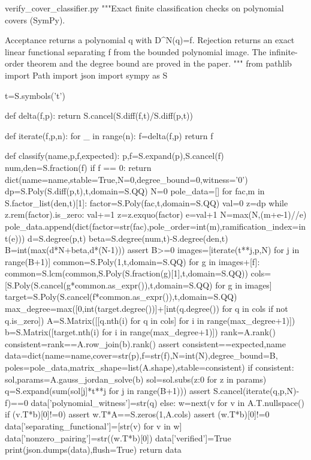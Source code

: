 \begin{filecontents*}[overwrite]{verify_cover_classifier.py}
"""Exact finite classification checks on polynomial covers (SymPy).

Acceptance returns a polynomial q with D^N(q)=f. Rejection returns an
exact linear functional separating f from the bounded polynomial image.
The infinite-order theorem and the degree bound are proved in the paper.
"""
from pathlib import Path
import json
import sympy as S

t=S.symbols('t')

def delta(f,p):
    return S.cancel(S.diff(f,t)/S.diff(p,t))

def iterate(f,p,n):
    for _ in range(n):
        f=delta(f,p)
    return f

def classify(name,p,f,expected):
    p,f=S.expand(p),S.cancel(f)
    num,den=S.fraction(f)
    if f == 0:
        return dict(name=name,stable=True,N=0,degree_bound=0,witness='0')
    dp=S.Poly(S.diff(p,t),t,domain=S.QQ)
    N=0
    pole_data=[]
    for fac,m in S.factor_list(den,t)[1]:
        factor=S.Poly(fac,t,domain=S.QQ)
        val=0
        z=dp
        while z.rem(factor).is_zero:
            val+=1
            z=z.exquo(factor)
        e=val+1
        N=max(N,(m+e-1)//e)
        pole_data.append(dict(factor=str(fac),pole_order=int(m),ramification_index=int(e)))
    d=S.degree(p,t)
    beta=S.degree(num,t)-S.degree(den,t)
    B=int(max(d*N+beta,d*(N-1)))
    assert B>=0
    images=[iterate(t**j,p,N) for j in range(B+1)]
    common=S.Poly(1,t,domain=S.QQ)
    for g in images+[f]:
        common=S.lcm(common,S.Poly(S.fraction(g)[1],t,domain=S.QQ))
    cols=[S.Poly(S.cancel(g*common.as_expr()),t,domain=S.QQ) for g in images]
    target=S.Poly(S.cancel(f*common.as_expr()),t,domain=S.QQ)
    max_degree=max([0,int(target.degree())]+[int(q.degree()) for q in cols if not q.is_zero])
    A=S.Matrix([[q.nth(i) for q in cols] for i in range(max_degree+1)])
    b=S.Matrix([target.nth(i) for i in range(max_degree+1)])
    rank=A.rank()
    consistent=rank==A.row_join(b).rank()
    assert consistent==expected,name
    data=dict(name=name,cover=str(p),f=str(f),N=int(N),degree_bound=B,
              poles=pole_data,matrix_shape=list(A.shape),stable=consistent)
    if consistent:
        sol,params=A.gauss_jordan_solve(b)
        sol=sol.subs({z:0 for z in params})
        q=S.expand(sum(sol[j]*t**j for j in range(B+1)))
        assert S.cancel(iterate(q,p,N)-f)==0
        data['polynomial_witness']=str(q)
    else:
        w=next(v for v in A.T.nullspace() if (v.T*b)[0]!=0)
        assert w.T*A==S.zeros(1,A.cols)
        assert (w.T*b)[0]!=0
        data['separating_functional']=[str(v) for v in w]
        data['nonzero_pairing']=str((w.T*b)[0])
    data['verified']=True
    print(json.dumps(data),flush=True)
    return data


\end{filecontents*}

